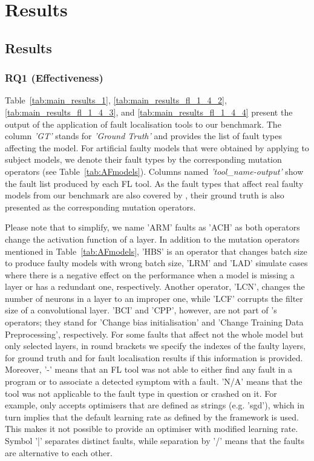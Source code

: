
\section{Results}
\label{sec:results}
\subsection{Results}
\subsubsection{RQ1 (Effectiveness)}

Table~\ref{tab:main_results_1}, \ref{tab:main_results_fl_1_4_2}, \ref{tab:main_results_fl_1_4_3}, and \ref{tab:main_results_fl_1_4_4} present the output of the application of fault localisation tools to our benchmark. The column \textit{'GT'} stands for \textit{'Ground Truth'} and provides the list of fault types affecting the model. For artificial faulty models that were obtained by applying \DC to subject models, we denote their fault types by the corresponding mutation operators (see Table~\ref{tab:AFmodels}). Columns named \textit{'tool\_name-output'} show the fault list produced by each FL tool. As the fault types that affect real faulty models from our benchmark are also covered by \DC, their ground truth is also presented as the corresponding mutation operators.

Please note that to simplify, we name 'ARM' faults as 'ACH' as both operators change the activation function of a layer. In addition to the mutation operators mentioned in Table~\ref{tab:AFmodels}, 'HBS' is an operator that changes batch size to produce faulty models with wrong batch size, 'LRM' and 'LAD' simulate cases where there is a negative effect on the performance when a model is missing a layer or has a redundant one, respectively. Another operator, 'LCN', changes the number of neurons in a layer to an improper one, while 'LCF' corrupts the filter size of a convolutional layer. 'BCI' and 'CPP', however, are not part of \DC's operators; they stand for 'Change bias initialisation' and 'Change Training Data Preprocessing', respectively. For some faults that affect not the whole model but only selected layers, in round brackets we specify the indexes of the faulty layers, for ground truth and for fault localisation results if this information is provided. Moreover, '-' means that an FL tool was not able to either find any fault in a program or to associate a detected symptom with a fault. 'N/A' means that the tool was not applicable to the fault type in question or crashed on it. For example, \NL only accepts optimisers that are defined as strings (e.g. 'sgd'), which in turn implies that the default learning rate as defined by the framework is used. This makes it not possible to provide an optimiser with modified learning rate. Symbol '|' separates distinct faults, while separation by '/' means that the faults are alternative to each other. 

